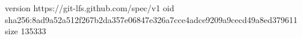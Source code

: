 version https://git-lfs.github.com/spec/v1
oid sha256:8ad9a52a512f267b2da357e06847e326a7cce4adce9209a9cecd49a8ed379611
size 135333
